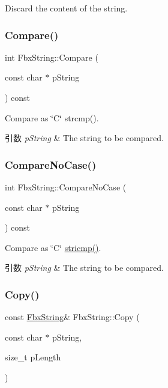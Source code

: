 Discard the content of the string. 

\mbox{\label{class_fbx_string_a42ed521019bea60f8bc77079c41adc06}} 
\subsubsection{\texorpdfstring{Compare()}{Compare()}}
{\footnotesize\ttfamily int Fbx\+String\+::\+Compare (\begin{DoxyParamCaption}\item[{const char $\ast$}]{p\+String }\end{DoxyParamCaption}) const}

Compare as \char`\"{}\+C\char`\"{} strcmp(). 
\begin{DoxyParams}{引数}
{\em p\+String} & The string to be compared. \\
\hline
\end{DoxyParams}
\mbox{\label{class_fbx_string_a8c7068a46cd93a53b982a97026cde255}} 
\subsubsection{\texorpdfstring{Compare\+No\+Case()}{CompareNoCase()}}
{\footnotesize\ttfamily int Fbx\+String\+::\+Compare\+No\+Case (\begin{DoxyParamCaption}\item[{const char $\ast$}]{p\+String }\end{DoxyParamCaption}) const}

Compare as \char`\"{}\+C\char`\"{} \hyperlink{fbxarch_8h_a4e0be90a3757e352f42612d09a7d1aa5}{stricmp()}. 
\begin{DoxyParams}{引数}
{\em p\+String} & The string to be compared. \\
\hline
\end{DoxyParams}
\mbox{\label{class_fbx_string_ae9461ab3157982b492e02fec9b5503fa}} 
\subsubsection{\texorpdfstring{Copy()}{Copy()}}
{\footnotesize\ttfamily const \hyperlink{class_fbx_string}{Fbx\+String}\& Fbx\+String\+::\+Copy (\begin{DoxyParamCaption}\item[{const char $\ast$}]{p\+String,  }\item[{size\+\_\+t}]{p\+Length }\end{DoxyParamCaption})}

